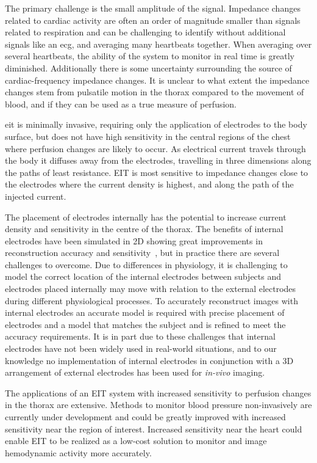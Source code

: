 The primary challenge is the small amplitude of the signal. 
Impedance changes related to cardiac activity are often an order of
magnitude smaller than signals related to respiration and can be challenging to identify without additional signals like 
an \acrfull{ecg}, and averaging many heartbeats together. When 
averaging over several heartbeats, the ability of the system to 
monitor in real time is greatly diminished. Additionally 
there is some uncertainty surrounding the source of
cardiac-frequency impedance changes. It is unclear to what 
extent the impedance changes stem from pulsatile
motion in the thorax compared to the movement of blood, 
and if they can be used as a true measure of perfusion. 

\acrshort{eit} is minimally invasive, requiring only 
the application of electrodes to the body surface, but 
does not have high sensitivity in the central regions 
of the chest where perfusion changes are likely to occur.
As electrical current travels through the body it diffuses away from 
the electrodes,
travelling in three dimensions along the paths of least resistance. 
EIT is most sensitive to impedance changes close to the electrodes
where the current density is highest, 
and along the path of the injected current.

The placement of electrodes internally has the 
potential to increase current density and sensitivity in 
the centre of the thorax. 
The benefits of internal electrodes have been simulated 
in 2D showing great improvements in reconstruction accuracy 
and sensitivity~\parencite{nasehi_tehrani_modelling_2012}, but 
in practice there are several challenges to overcome. 
Due to differences in physiology, it is challenging to model
the correct location of the internal electrodes between subjects
and electrodes placed internally may move with relation 
to the external electrodes during different physiological
processes.  
To accurately reconstruct images with internal electrodes 
an accurate model is required with precise placement of electrodes
and a model that matches the subject and is refined 
to meet the accuracy requirements. 
It is in part due to these challenges that internal electrodes 
have not been widely used in real-world situations, and to our knowledge 
no implementation of internal electrodes in conjunction 
with a 3D arrangement of external electrodes has been used for \emph{in-vivo}
imaging.

The applications of an EIT system with increased sensitivity to perfusion changes
in the thorax are extensive. Methods to monitor blood pressure non-invasively are 
currently under development and could be greatly improved with increased sensitivity 
near the region of interest. Increased sensitivity near the heart 
could enable EIT to be realized as a low-cost solution to monitor and image
hemodynamic activity more accurately.  

